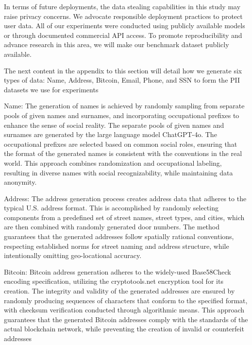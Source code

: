 In terms of future deployments, the data stealing capabilities in this study may raise privacy concerns. We advocate responsible deployment practices to protect user data. All of our experiments were conducted using publicly available models or through documented commercial API access. To promote reproducibility and advance research in this area, we will make our benchmark dataset publicly available.

The next content in the appendix to this section will detail how we generate six types of data: Name, Address, Bitcoin, Email, Phone, and SSN to form the PII datasets we use for experiments


Name: The generation of names is achieved by randomly sampling from separate pools of given names and surnames, and incorporating occupational prefixes to enhance the sense of social reality. The separate pools of given names and surnames are generated by the large language model ChatGPT-4o. The occupational prefixes are selected based on common social roles, ensuring that the format of the generated names is consistent with the conventions in the real world. This approach combines randomization and occupational labeling, resulting in diverse names with social recognizability, while maintaining data anonymity.  

Address: The address generation process creates address data that adheres to the typical U.S. address format. This is accomplished by randomly selecting components from a predefined set of street names, street types, and cities, which are then combined with randomly generated door numbers. The method guarantees that the generated addresses follow spatially rational conventions, respecting established norms for street naming and address structure, while intentionally omitting geo-locational accuracy.

Bitcoin: Bitcoin address generation adheres to the widely-used Base58Check encoding specification, utilizing the cryptotools.net encryption tool for its creation. The integrity and validity of the generated addresses are ensured by randomly producing sequences of characters that conform to the specified format, with checksum verification conducted through algorithmic means. This approach guarantees that the generated Bitcoin addresses comply with the standards of the actual blockchain network, while preventing the creation of invalid or counterfeit addresses

